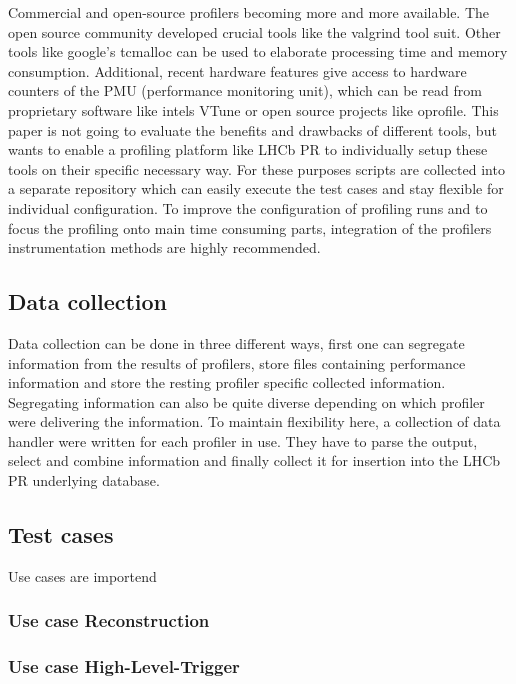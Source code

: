 \documentclass[a4paper]{jpconf}
\begin{document}
Commercial and open-source profilers becoming more and more available. The open source community developed crucial tools like the valgrind tool suit. Other tools like google's tcmalloc can be used to elaborate processing time and memory consumption. Additional, recent hardware features give access to hardware counters of the PMU (performance monitoring unit), which can be read from proprietary software like intels VTune or open source projects like oprofile.
\newline
This paper is not going to evaluate the benefits and drawbacks of different tools, but wants to enable a profiling platform like LHCb PR to individually setup these tools on their specific necessary way. For these purposes scripts are collected into a separate repository which can easily execute the test cases and stay flexible for individual configuration. To improve the configuration of profiling runs and to focus the profiling onto main time consuming parts, integration of the profilers instrumentation methods are highly recommended.

\subsection{Data collection}
\label{sec:data_collection}

Data collection can be done in three different ways, first one can segregate information from the results of profilers, store files containing performance information and store the resting profiler specific collected information. Segregating information can also be quite diverse depending on which profiler were delivering the information. To maintain flexibility here, a collection of data handler were written for each profiler in use. They have to parse the output, select and combine information and finally collect it for insertion into the LHCb PR underlying database.  

\subsection{Test cases}
\label{sec:test_cases}

Use cases are importend 

\subsubsection{Use case Reconstruction}
\label{sec:use_case_rec}

\subsubsection{Use case High-Level-Trigger}
\label{sec:use_case_hlt}
\end{document}
